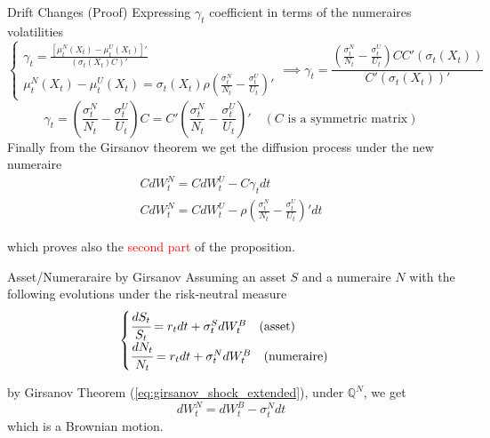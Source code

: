 \documentclass{beamer}
\begin{document}
\begin{frame}{Drift Changes (Proof)}
  Expressing $\gamma_t$ coefficient in terms of the numeraires volatilities
  \begin{equation*}
    \begin{cases}
      \gamma_t = \frac{[\mu_t^N(X_t) - \mu_t^U(X_t)]'}{(\sigma_t(X_t)C)'}\\
      \mu_t^N(X_t) - \mu_t^U(X_t) = \sigma_t(X_t)\rho \left(\frac{\sigma^N_t}{N_t} - \frac{\sigma^U_t}{U_t}\right)'
    \end{cases}\implies \gamma_t = \frac{\left(\frac{\sigma^N_t}{N_t} - \frac{\sigma^U_t}{U_t}\right)CC'(\sigma_t(X_t))}{C'(\sigma_t(X_t))'}
  \end{equation*}
  \begin{equation}
    \gamma_t = \left(\frac{\sigma^N_t}{N_t} - \frac{\sigma^U_t}{U_t}\right)C = C'\left(\frac{\sigma^N_t}{N_t} - \frac{\sigma^U_t}{U_t}\right)'\quad(\text{$C$ is a symmetric matrix})    
    \label{eq:gamma_3}
  \end{equation}
	\pause
  Finally from the Girsanov theorem we get the diffusion process under the new numeraire
  \begin{equation}
    \begin{gathered}
      CdW^N_t = CdW^U_t - C\gamma_t dt \\
      CdW^N_t = CdW^U_t - \rho\left(\frac{\sigma^N_t}{N_t}-\frac{\sigma^U_t}{U_t}\right)' dt
    \end{gathered}
	\label{eq:girsanov_shock_extended}
  \end{equation}
\myendproof

 which proves also the \textcolor{red}{second part} of the proposition.
  
\end{frame}

\begin{frame}{Asset/Numeraraire by Girsanov}
  Assuming an asset $S$ and a numeraire $N$ with the following evolutions under the risk-neutral measure
  \begin{equation}
    \begin{cases}
      \cfrac{dS_t}{S_t} = r_tdt + \sigma^S_t dW^B_t\quad\text{(asset)} \\
      \cfrac{dN_t}{N_t} = r_tdt + \sigma^N_t dW^B_t\quad\text{(numeraire)}
    \end{cases}
    \label{eq:S_N_dynamics}
  \end{equation}
  
  by Girsanov Theorem (\cref{eq:girsanov_shock_extended}), under $\mathbb{Q}^N$, we get
  \begin{equation}
    dW^N_t = dW_t^B - \sigma_t^N dt
    \label{eq:girsanov_ex}
  \end{equation}
  which is a Brownian motion.
\end{frame}
\end{document}
